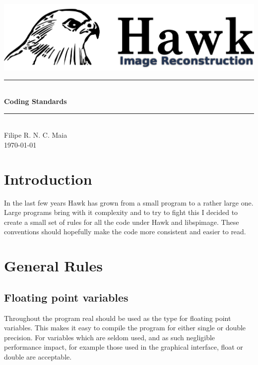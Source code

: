 \documentclass[12pt]{article}
\newcommand{\HRule}{\rule{\linewidth}{0.5mm}}
\begin{document}
\begin{center}
\includegraphics[width=1\textwidth]{./Hawk2.png}\\[0.5cm]
\HRule \\[0.4cm]
{\huge \bfseries Coding Standards}\\[0.1cm]
\HRule \\[1.0cm]
{\large Filipe R. N. C. Maia}\\[0.4cm]
{\large \today}\\[1.0cm]
\end{center}




\section{Introduction}
In the last few years Hawk has grown from a small program to a rather large one. Large programs bring
with it complexity and to try to fight this I decided to create a small set of rules for all the code
under Hawk and libspimage. These conventions should hopefully make the code more consistent and easier to read.

\section{General Rules}
\subsection{Floating point variables}
Throughout the program real should be used as the type for floating point variables.
This makes it easy to compile the program for either single or double precision. 
For variables which are seldom used, and as such negligible performance impact, for example those used in the graphical interface, float or double are acceptable.
\end{document}
